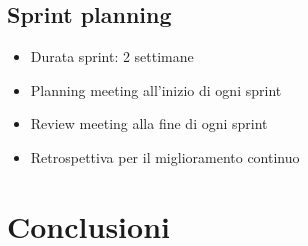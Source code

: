 \documentclass[11pt,a4paper]{article}
\begin{document}
\subsection{Sprint planning}
\begin{itemize}
    \item Durata sprint: 2 settimane
    \item Planning meeting all'inizio di ogni sprint
    \item Review meeting alla fine di ogni sprint
    \item Retrospettiva per il miglioramento continuo
\end{itemize}

\newpage

\section{Conclusioni}
\end{document}
